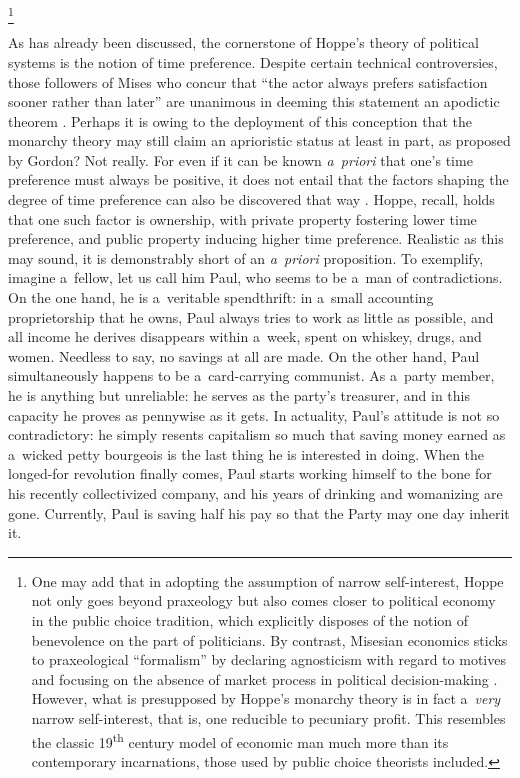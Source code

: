 \footnote{One may add that in adopting the assumption of narrow self-interest, Hoppe not only goes beyond praxeology but also comes closer to political economy in the public choice tradition, which explicitly disposes of the notion of benevolence on the part of politicians. By contrast, Misesian economics sticks to praxeological ``formalism'' by declaring agnosticism with regard to motives and focusing on the absence of market process in political decision-making 
\parencite[][]{boettke_austrian_2002}. %
 However, what is presupposed by Hoppe's monarchy theory is in fact a~\textit{very} narrow self-interest, that is, one reducible to pecuniary profit. This resembles the classic 19\textsuperscript{th} century model of economic man much more than its contemporary incarnations, those used by public choice theorists included. }



As has already been discussed, the cornerstone of Hoppe's theory of political systems is the notion of time preference. Despite certain technical controversies, those followers of Mises who concur that ``the actor always prefers satisfaction sooner rather than later'' are unanimous in deeming this statement an apodictic theorem 
\parencites[][]{herbener_introduction_2011}[][pp.480–485]{mises_human_1998}[][p.15]{rothbard_man_2009}. %
 Perhaps it is owing to the deployment of this conception that the monarchy theory may still claim an aprioristic status at least in part, as proposed by Gordon? Not really. For even if it can be known \textit{a~priori} that one's time preference must always be positive, it does not entail that the factors shaping the degree of time preference can also be discovered that way 
\parencite[][]{block_relationship_2006}. %
 Hoppe, recall, holds that one such factor is ownership, with private property fostering lower time preference, and public property inducing higher time preference. Realistic as this may sound, it is demonstrably short of an \textit{a~priori} proposition. To exemplify, imagine a~fellow, let us call him Paul, who seems to be a~man of contradictions. On the one hand, he is a~veritable spendthrift: in a~small accounting proprietorship that he owns, Paul always tries to work as little as possible, and all income he derives disappears within a~week, spent on whiskey, drugs, and women. Needless to say, no savings at all are made. On the other hand, Paul simultaneously happens to be a~card-carrying communist. As a~party member, he is anything but unreliable: he serves as the party's treasurer, and in this capacity he proves as pennywise as it gets. In actuality, Paul's attitude is not so contradictory: he simply resents capitalism so much that saving money earned as a~wicked petty bourgeois is the last thing he is interested in doing. When the longed-for revolution finally comes, Paul starts working himself to the bone for his recently collectivized company, and his years of drinking and womanizing are gone. Currently, Paul is saving half his pay so that the Party may one day inherit it.



